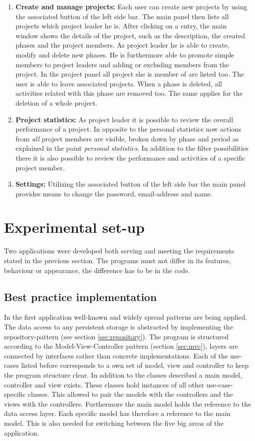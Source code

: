 \begin{enumerate}
\item \textbf{Create and manage projects:} Each user can create new projects by using the associated button of the left side bar. The main panel then lists all projects which project leader he is. After clicking on a entry, the main window shows the details of the project, such as the description, the created phases and the project members. As project leader he is able to create, modify and delete new phases. He is furthermore able to promote simple members to project leaders and adding or excluding members from the project. In the project panel all project she is member of are listed too. The user is able to leave associated projects. When a phase is deleted, all activities related with this phase are removed too. The same applies for the deletion of a whole project. 

\item \textbf{Project statistics:} As project leader it is possible to review the overall performance of a project. In opposite to the personal statistics now actions from \emph{all} project members are visible, broken down by phase and period as explained in the point \emph{personal statistics}. In addition to the filter possibilities there it is also possible to review the performance and activities of a specific project member.

\item \textbf{Settings:} Utilizing the associated button of the left side bar the main panel provides means to change the password, email-address and name.
\end{enumerate}

\section{Experimental set-up}
Two applications were developed both serving and meeting the requirements stated in the previous section. The programs must not differ in its features, behaviour or appearance, the difference has to be in the code. 
\subsection{Best practice implementation}
In the first application well-known and widely spread patterns are being applied. The data access to any persistent storage is abstracted by implementing the repository-pattern (see section \ref{sec:repository}). The program is structured according to the Model-View-Controller pattern (section \ref{sec:mvc}), layers are connected by interfaces rather than concrete implementations. Each of the use-cases listed before corresponds to a own set of model, view and controller to keep the program structure clear. In addition to the classes described a main model, controller and view exists. These classes hold instances of all other use-case-specific classes. This allowed to pair the models with the controllers and the views with the controllers. Furthermore the main model holds the reference to the data access layer. Each specific model has therefore a reference to the main model. This is also needed for switching between the five big areas of the application.

